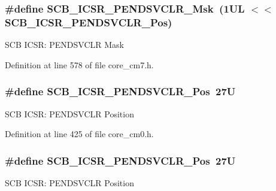 \subsubsection[{\texorpdfstring{S\+C\+B\+\_\+\+I\+C\+S\+R\+\_\+\+P\+E\+N\+D\+S\+V\+C\+L\+R\+\_\+\+Msk}{SCB_ICSR_PENDSVCLR_Msk}}]{\setlength{\rightskip}{0pt plus 5cm}\#define S\+C\+B\+\_\+\+I\+C\+S\+R\+\_\+\+P\+E\+N\+D\+S\+V\+C\+L\+R\+\_\+\+Msk~(1\+U\+L $<$$<$ S\+C\+B\+\_\+\+I\+C\+S\+R\+\_\+\+P\+E\+N\+D\+S\+V\+C\+L\+R\+\_\+\+Pos)}\hypertarget{group___c_m_s_i_s___s_c_b_ga4a901ace381d3c1c74ac82b22fae2e1e}{}\label{group___c_m_s_i_s___s_c_b_ga4a901ace381d3c1c74ac82b22fae2e1e}
S\+CB I\+C\+SR\+: P\+E\+N\+D\+S\+V\+C\+LR Mask 

Definition at line 578 of file core\+\_\+cm7.\+h.

\subsubsection[{\texorpdfstring{S\+C\+B\+\_\+\+I\+C\+S\+R\+\_\+\+P\+E\+N\+D\+S\+V\+C\+L\+R\+\_\+\+Pos}{SCB_ICSR_PENDSVCLR_Pos}}]{\setlength{\rightskip}{0pt plus 5cm}\#define S\+C\+B\+\_\+\+I\+C\+S\+R\+\_\+\+P\+E\+N\+D\+S\+V\+C\+L\+R\+\_\+\+Pos~27U}\hypertarget{group___c_m_s_i_s___s_c_b_gae218d9022288f89faf57187c4d542ecd}{}\label{group___c_m_s_i_s___s_c_b_gae218d9022288f89faf57187c4d542ecd}
S\+CB I\+C\+SR\+: P\+E\+N\+D\+S\+V\+C\+LR Position 

Definition at line 425 of file core\+\_\+cm0.\+h.

\subsubsection[{\texorpdfstring{S\+C\+B\+\_\+\+I\+C\+S\+R\+\_\+\+P\+E\+N\+D\+S\+V\+C\+L\+R\+\_\+\+Pos}{SCB_ICSR_PENDSVCLR_Pos}}]{\setlength{\rightskip}{0pt plus 5cm}\#define S\+C\+B\+\_\+\+I\+C\+S\+R\+\_\+\+P\+E\+N\+D\+S\+V\+C\+L\+R\+\_\+\+Pos~27U}\hypertarget{group___c_m_s_i_s___s_c_b_gae218d9022288f89faf57187c4d542ecd}{}\label{group___c_m_s_i_s___s_c_b_gae218d9022288f89faf57187c4d542ecd}
S\+CB I\+C\+SR\+: P\+E\+N\+D\+S\+V\+C\+LR Position 

